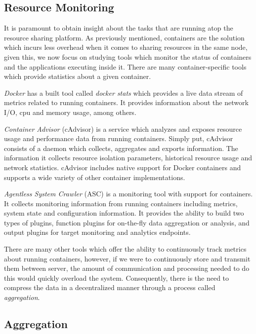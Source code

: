 \subsection{Resource Monitoring}

It is paramount to obtain insight about the tasks that are running atop the resource sharing platform. As previously mentioned, containers are the solution which incurs less overhead when it comes to sharing resources in the same node, given this, we now focus on studying tools which monitor the status of containers and the applications executing inside it. There are many container-specific tools which provide statistics about a given container.

\textit{Docker} \cite{docker} has a built tool called \textit{docker stats} \cite{docker_stats} which provides a live data stream of metrics related to running containers. It provides information about the network I/O, cpu and memory usage, among others. 

\textit{Container Advisor} \cite{cAdvisor} (cAdvisor) is a service which analyzes and exposes resource usage and performance data from running containers. Simply put, cAdvisor consists of a daemon which collects, aggregates and exports information. The information it collects resource isolation parameters, historical resource usage and network statistics. cAdvisor includes native support for Docker containers and supports a wide variety of other container implementations.

\textit{Agentless System Crawler}  (ASC) \cite{cloudviz_2019} is a monitoring tool with support for containers. It collects monitoring information from running containers including metrics, system state and configuration information. It provides the ability to build two types of plugins, function  plugins for on-the-fly data aggregation or analysis, and output plugins for target monitoring and analytics endpoints.

There are many other tools which offer the ability to continuously track metrics about running containers, however, if we were to continuously store and transmit them between server, the amount of communication and processing needed to do this would quickly overload the system. Consequently, there is the need  to compress the data in a decentralized manner through a process called \textit{aggregation}.

\subsection{Aggregation}

